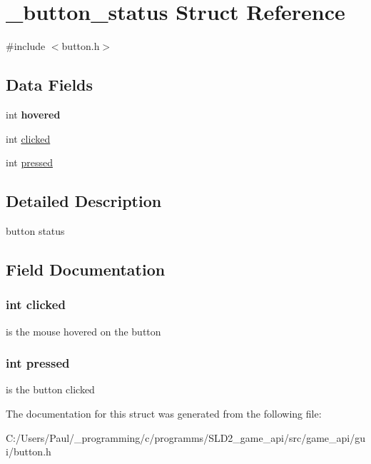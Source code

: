 \hypertarget{struct__button__status}{\section{\+\_\+button\+\_\+status Struct Reference}
\label{struct__button__status}
}


{\ttfamily \#include $<$button.\+h$>$}

\subsection*{Data Fields}
\begin{DoxyCompactItemize}
\item 
\hypertarget{struct__button__status_a04d9c4c9b283d16ce102b1482fdff900}{int {\bfseries hovered}}\label{struct__button__status_a04d9c4c9b283d16ce102b1482fdff900}

\item 
int \hyperlink{struct__button__status_aad83a4a92c010109563cfd522cf2aa8f}{clicked}
\item 
int \hyperlink{struct__button__status_a9a8271834e4fd4341e41a0e182d6cdff}{pressed}
\end{DoxyCompactItemize}


\subsection{Detailed Description}
button status 

\subsection{Field Documentation}
\hypertarget{struct__button__status_aad83a4a92c010109563cfd522cf2aa8f}{
\subsubsection[{clicked}]{\setlength{\rightskip}{0pt plus 5cm}int clicked}}\label{struct__button__status_aad83a4a92c010109563cfd522cf2aa8f}
is the mouse hovered on the button \hypertarget{struct__button__status_a9a8271834e4fd4341e41a0e182d6cdff}{
\subsubsection[{pressed}]{\setlength{\rightskip}{0pt plus 5cm}int pressed}}\label{struct__button__status_a9a8271834e4fd4341e41a0e182d6cdff}
is the button clicked 

The documentation for this struct was generated from the following file\+:\begin{DoxyCompactItemize}
\item 
C\+:/\+Users/\+Paul/\+\_\+programming/c/programms/\+S\+L\+D2\+\_\+game\+\_\+api/src/game\+\_\+api/gui/button.\+h\end{DoxyCompactItemize}
